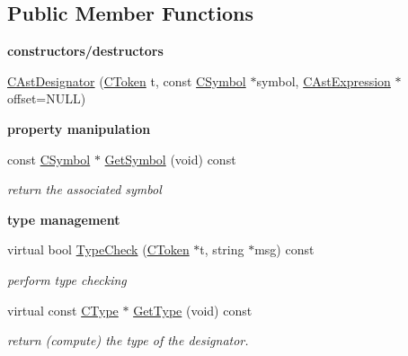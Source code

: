 \subsection*{Public Member Functions}
\begin{Indent}{\bf constructors/destructors}\par
\begin{DoxyCompactItemize}
\item 
\hyperlink{classCAstDesignator_ab7f90bf588b84bd97ed32d8e7b5dbae7}{C\-Ast\-Designator} (\hyperlink{classCToken}{C\-Token} t, const \hyperlink{classCSymbol}{C\-Symbol} $\ast$symbol, \hyperlink{classCAstExpression}{C\-Ast\-Expression} $\ast$offset=N\-U\-L\-L)
\end{DoxyCompactItemize}
\end{Indent}
\begin{Indent}{\bf property manipulation}\par
\begin{DoxyCompactItemize}
\item 
\hypertarget{classCAstDesignator_a9df5f3d5eec3df2664090a60cca544b5}{const \hyperlink{classCSymbol}{C\-Symbol} $\ast$ \hyperlink{classCAstDesignator_a9df5f3d5eec3df2664090a60cca544b5}{Get\-Symbol} (void) const }\label{classCAstDesignator_a9df5f3d5eec3df2664090a60cca544b5}

\begin{DoxyCompactList}\small\item\em return the associated symbol \end{DoxyCompactList}\end{DoxyCompactItemize}
\end{Indent}
\begin{Indent}{\bf type management}\par
\begin{DoxyCompactItemize}
\item 
virtual bool \hyperlink{classCAstDesignator_a648dc96e88f1005ae41cd220d2bf82d6}{Type\-Check} (\hyperlink{classCToken}{C\-Token} $\ast$t, string $\ast$msg) const 
\begin{DoxyCompactList}\small\item\em perform type checking \end{DoxyCompactList}\item 
\hypertarget{classCAstDesignator_aa9c8ae0725896a746cfc54832de0b105}{virtual const \hyperlink{classCType}{C\-Type} $\ast$ \hyperlink{classCAstDesignator_aa9c8ae0725896a746cfc54832de0b105}{Get\-Type} (void) const }\label{classCAstDesignator_aa9c8ae0725896a746cfc54832de0b105}

\begin{DoxyCompactList}\small\item\em return (compute) the type of the designator. \end{DoxyCompactList}\end{DoxyCompactItemize}
\end{Indent}
